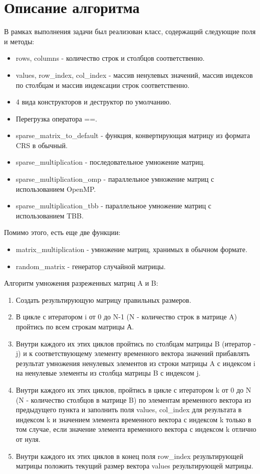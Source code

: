 \documentclass{report}
\begin{document}
\newpage

\section* {Описание алгоритма}
В рамках выполнения задачи был реализован класс, содержащий следующие поля и методы:
\begin{itemize}
    \item rows, columns - количество строк и столбцов соответственно.
    \item values, row\_index, col\_index - массив ненулевых значений, массив индексов по столбцам и массив индексации строк соответственно.
    \item 4 вида конструкторов и деструктор по умолчанию. 
    \item Перегрузка оператора ==.
    \item sparse\_matrix\_to\_default - функция, конвертирующая матрицу из формата CRS в обычный.
    \item sparse\_multiplication - последовательное умножение матриц.
    \item sparse\_multiplication\_omp - параллельное умножение матриц с использованием OpenMP.
    \item sparse\_multiplication\_tbb - параллельное умножение матриц с использованием TBB.
\end{itemize}

\par
Помимо этого, есть еще две функции:
\begin{itemize}
    \item matrix\_multiplication - умножение матриц, хранимых в обычном формате.
    \item random\_matrix - генератор случайной матрицы.
\end{itemize}

\par
Алгоритм умножения разреженных матриц A и B:
\begin{enumerate}
    \item Создать результирующую матрицу правильных размеров.
    \item В цикле с итератором i от 0 до N-1 (N - количество строк в матрице A) пройтись по всем строкам матрицы А.
    \item Внутри каждого их этих циклов пройтись по столбцам матрицы B (итератор - j) и к соответствующему элементу временного вектора значений прибавлять результат умножения ненулевых элементов из строки матрицы A с индексом i на ненулевые элементы из столбца матрицы B с индексом j.
    \item Внутри каждого их этих циклов, пройтись в цикле с итератором k от 0 до N (N - количество столбцов в матрице B) по элементам временного вектора из предыдущего пункта и заполнить поля values, col\_index для результата в индексом k и значением элемента временного вектора с индексом k только в том случае, если значение элемента временного вектора с индексом k отлично от нуля.
    \item Внутри каждого их этих циклов в конец поля row\_index результирующей матрицы положить текущий размер вектора values результирующей матрицы.
\end{enumerate}
\end{document}
